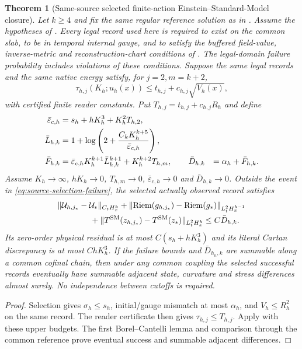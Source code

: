 \documentclass[11pt]{article}
\numberwithin{equation}{section}
\newtheorem{theorem}{Theorem}[section]
\theoremstyle{definition}
\theoremstyle{remark}
\newcommand{\Riem}{\operatorname{Riem}}
\newcommand{\norm}[1]{\lVert#1\rVert}
\begin{document}
\begin{theorem}[Same-source selected finite-action Einstein--Standard-Model closure]
\label{thm:native-selected-closure}
Let $k\ge4$ and fix the same regular reference solution as in .  Assume the hypotheses of .  Every legal record used here is required to exist on the common slab, to be in temporal internal gauge, and to satisfy the buffered field-value, inverse-metric and reconstruction-chart conditions of .  The legal-domain failure probability includes violations of these conditions.  Suppose the same legal records and the same native energy satisfy, for $j=2,m=k+2$,
\begin{equation}
 \tau_{h,j}(K_h;u_h(x))\le t_{h,j}+c_{h,j}\sqrt{V_h(x)},
 \label{eq:selected-reader-general}
\end{equation}
with certified finite reader constants.  Put $T_{h,j}=t_{h,j}+c_{h,j}R_h$ and define
\begin{align}
 \bar\varepsilon_{c,h}&=s_h+hK_h^3+K_h^2T_{h,2},\notag\\
 \bar L_{h,k}&=1+\log\left(2+\frac{C_kK_h^{k+5}}{\bar\varepsilon_{c,h}}\right),\notag\\
 \bar F_{h,k}&=\bar\varepsilon_{c,h}K_h^{k+1}\bar L_{h,k}^{k+1}
                   +K_h^{k+2}T_{h,m},\qquad
 \bar D_{h,k}&=\alpha_h+\bar F_{h,k}.
 \label{eq:selected-composed-budget}
\end{align}
Assume $K_h\to\infty$, $hK_h\to0$, $T_{h,m}\to0$, $\bar\varepsilon_{c,h}\to0$ and $\bar D_{h,k}\to0$.  Outside the event in \eqref{eq:source-selection-failure}, the selected actually observed record satisfies
\begin{align}
 &\norm{\mathcal U_{h,j_*}-\mathcal U_*}_{C_tH_x^k}
 +\norm{\Riem(g_{h,j_*})-\Riem(g_*)}_{L^2_tH_x^{k-1}}\notag\\
 &\hspace{4em}
 +\norm{T^{\rm SM}(z_{h,j_*})-T^{\rm SM}(z_*)}_{L^2_tH_x^k}
 \le C\bar D_{h,k}.
 \label{eq:selected-closure}
\end{align}
Its zero-order physical residual is at most $C(s_h+hK_h^3)$ and its literal Cartan discrepancy is at most $ChK_h^3$.  If the failure bounds and $\bar D_{h_n,k}$ are summable along a common cofinal chain, then under any common coupling the selected successful records eventually have summable adjacent state, curvature and stress differences almost surely.  No independence between cutoffs is required.
\end{theorem}
\begin{proof}
Selection gives $\sigma_h\le s_h$, initial/gauge mismatch at most
$\alpha_h$, and $V_h\le R_h^2$ on the same record. The reader certificate
then gives $\tau_{h,j}\le T_{h,j}$. Apply
 with these upper budgets.
The first Borel--Cantelli lemma and comparison through the common reference
prove eventual success and summable adjacent differences.
\end{proof}
\end{document}
